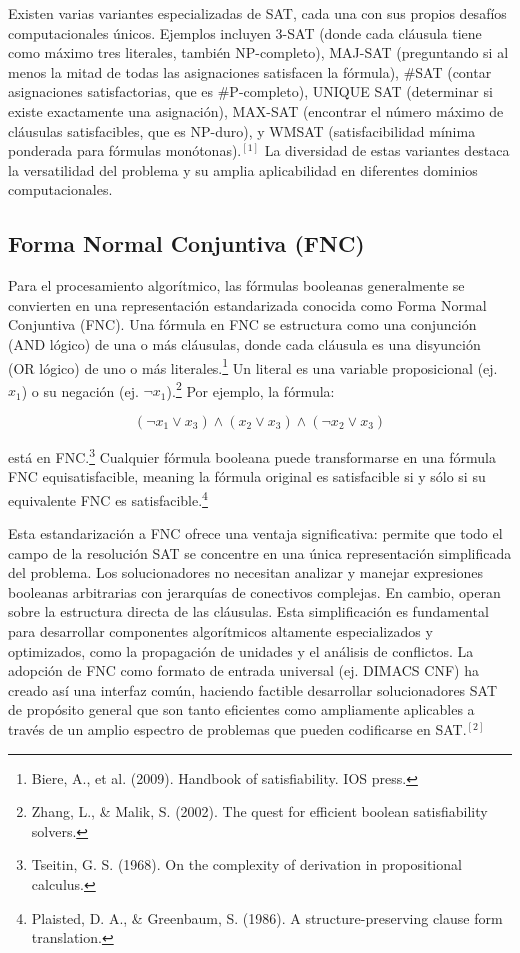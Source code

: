 \documentclass{article}
\begin{document}
Existen varias variantes especializadas de SAT, cada una con sus propios desafíos computacionales únicos. Ejemplos incluyen 3-SAT (donde cada cláusula tiene como máximo tres literales, también NP-completo), MAJ-SAT (preguntando si al menos la mitad de todas las asignaciones satisfacen la fórmula), \#SAT (contar asignaciones satisfactorias, que es \#P-completo), UNIQUE SAT (determinar si existe exactamente una asignación), MAX-SAT (encontrar el número máximo de cláusulas satisfacibles, que es NP-duro), y WMSAT (satisfacibilidad mínima ponderada para fórmulas monótonas).$^{[1]}$ La diversidad de estas variantes destaca la versatilidad del problema y su amplia aplicabilidad en diferentes dominios computacionales.

\subsection{Forma Normal Conjuntiva (FNC)}

Para el procesamiento algorítmico, las fórmulas booleanas generalmente se convierten en una representación estandarizada conocida como Forma Normal Conjuntiva (FNC). Una fórmula en FNC se estructura como una conjunción (AND lógico) de una o más cláusulas, donde cada cláusula es una disyunción (OR lógico) de uno o más literales.\footnote{Biere, A., et al. (2009). Handbook of satisfiability. IOS press.} Un literal es una variable proposicional (ej. $x_1$) o su negación (ej. $\neg x_1$).\footnote{Zhang, L., \& Malik, S. (2002). The quest for efficient boolean satisfiability solvers.} Por ejemplo, la fórmula:

\[
(\neg x_1 \lor x_3) \land (x_2 \lor x_3) \land (\neg x_2 \lor x_3)
\]

está en FNC.\footnote{Tseitin, G. S. (1968). On the complexity of derivation in propositional calculus.} Cualquier fórmula booleana puede transformarse en una fórmula FNC equisatisfacible, meaning la fórmula original es satisfacible si y sólo si su equivalente FNC es satisfacible.\footnote{Plaisted, D. A., \& Greenbaum, S. (1986). A structure-preserving clause form translation.}

Esta estandarización a FNC ofrece una ventaja significativa: permite que todo el campo de la resolución SAT se concentre en una única representación simplificada del problema. Los solucionadores no necesitan analizar y manejar expresiones booleanas arbitrarias con jerarquías de conectivos complejas. En cambio, operan sobre la estructura directa de las cláusulas. Esta simplificación es fundamental para desarrollar componentes algorítmicos altamente especializados y optimizados, como la propagación de unidades y el análisis de conflictos. La adopción de FNC como formato de entrada universal (ej. DIMACS CNF) ha creado así una interfaz común, haciendo factible desarrollar solucionadores SAT de propósito general que son tanto eficientes como ampliamente aplicables a través de un amplio espectro de problemas que pueden codificarse en SAT.$^{[2]}$ 
\end{document}
